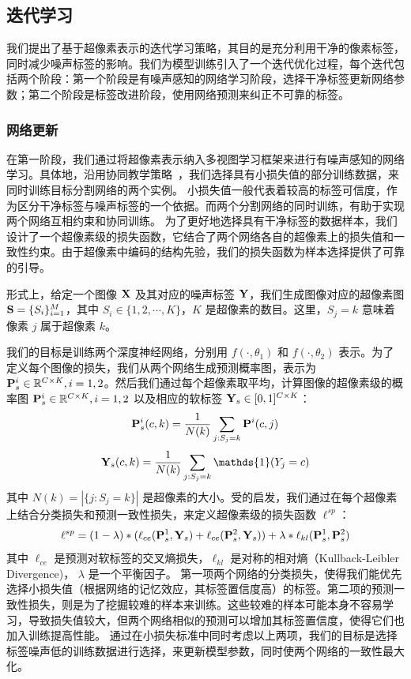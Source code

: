 \subsection{迭代学习} \label{sec:p2_2}
我们提出了基于超像素表示的迭代学习策略，其目的是充分利用干净的像素标签，同时减少噪声标签的影响。我们为模型训练引入了一个迭代优化过程，每个迭代包括两个阶段：第一个阶段是有噪声感知的网络学习阶段，选择干净标签更新网络参数；第二个阶段是标签改进阶段，使用网络预测来纠正不可靠的标签。

\subsubsection{网络更新}

在第一阶段，我们通过将超像素表示纳入多视图学习框架来进行有噪声感知的网络学习。具体地，沿用协同教学策略~\citep{ren2018learning, jiang2018mentornet, Han2018CoteachingRT}，我们选择具有小损失值\citep{arpit2017closer}的部分训练数据，来同时训练目标分割网络的两个实例。
小损失值一般代表着较高的标签可信度，作为区分干净标签与噪声标签的一个依据。而两个分割网络的同时训练，有助于实现两个网络互相约束和协同训练。
为了更好地选择具有干净标签的数据样本，我们设计了一个超像素级的损失函数，它结合了两个网络各自的超像素上的损失值和一致性约束\citep{Wei2020CombatingNL}。由于超像素中编码的结构先验，我们的损失函数为样本选择提供了可靠的引导。

形式上，给定一个图像 $\mathbf{X}$ 及其对应的噪声标签 $\mathbf{Y}$，我们生成图像对应的超像素图 $\mathbf{S} =\{S_i\}_{i=1}^M$，其中 $S_i\in\{1,2,\cdots, K\}$，$K$ 是超像素的数目。这里，$S_j=k$ 意味着像素 $j$ 属于超像素 $k$。

我们的目标是训练两个深度神经网络，分别用 $f(\cdot, \theta_1)$ 和 $f(\cdot, \theta_2)$ 表示。为了定义每个图像的损失，我们从两个网络生成预测概率图，表示为 $\mathbf{P}_s^i\in\mathbb{R}^{C \times K}, i=1,2$。然后我们通过每个超像素取平均，计算图像的超像素级的概率图 $\mathbf{P}_s^i\in\mathbb{R}^{C \times K}, i=1,2$ 以及相应的软标签 ${\mathbf{Y}_s}\in[0,1]^{C\times K}$：
\begin{align} \label{eq:joint_prob}
    \mathbf{P}^i_s(c,k) = \frac{1}{N(k)}\sum_{j:S_j = k} \mathbf{P}^i(c,j)
\end{align}
\begin{align}
    \mb{Y}_s(c,k) =\frac{1}{N(k)} \sum_{j:S_j = k}\mathds{1}(Y_j = c)
\end{align}
其中 $N(k) = |\{j:S_j = k\}|$ 是超像素的大小。受\citet{Wei2020CombatingNL}的启发，我们通过在每个超像素上结合分类损失和预测一致性损失，来定义超像素级的损失函数 $\ell^{sp}$：
\begin{equation}\label{l_k}
	\ell^{sp} = (1-\lambda)*(\ell_{ce}(\mathbf{P}^1_s,\mathbf{Y}_s) + \ell_{ce}(\mathbf{P}^2_s,\mathbf{Y}_s)) + \lambda *\ell_{kl}(\mathbf{P}^1_s,\mathbf{P}^2_s)
\end{equation}
其中 $\ell_{ce}$ 是预测对软标签的交叉熵损失，$\ell_{kl}$ 是对称的相对熵（Kullback-Leibler Divergence)， $\lambda$ 是一个平衡因子。
第一项两个网络的分类损失，使得我们能优先选择小损失值（根据网络的记忆效应，其标签置信度高）的标签。第二项的预测一致性损失，则是为了挖掘较难的样本来训练。这些较难的样本可能本身不容易学习，导致损失值较大，但两个网络相似的预测可以增加其标签置信度，使得它们也加入训练提高性能。
通过在小损失标准中同时考虑以上两项，我们的目标是选择标签噪声低的训练数据进行选择，来更新模型参数，同时使两个网络的一致性最大化。

